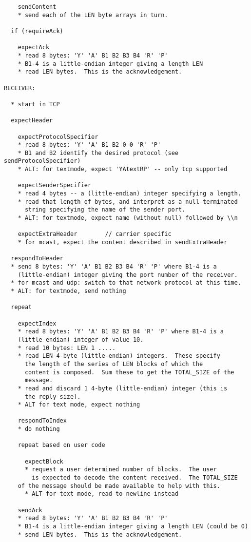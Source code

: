 \documentclass[a4]{article}
\begin{document}
\begin{verbatim}
    sendContent
    * send each of the LEN byte arrays in turn.

  if (requireAck)

    expectAck
    * read 8 bytes: 'Y' 'A' B1 B2 B3 B4 'R' 'P'
    * B1-4 is a little-endian integer giving a length LEN
    * read LEN bytes.  This is the acknowledgement.

RECEIVER:

  * start in TCP

  expectHeader

    expectProtocolSpecifier
    * read 8 bytes: 'Y' 'A' B1 B2 0 0 'R' 'P'
    * B1 and B2 identify the desired protocol (see sendProtocolSpecifier)
    * ALT: for textmode, expect 'YAtextRP' -- only tcp supported

    expectSenderSpecifier
    * read 4 bytes -- a (little-endian) integer specifying a length.
    * read that length of bytes, and interpret as a null-terminated
      string specifying the name of the sender port.
    * ALT: for textmode, expect name (without null) followed by \\n

    expectExtraHeader        // carrier specific
    * for mcast, expect the content described in sendExtraHeader

  respondToHeader
  * send 8 bytes: 'Y' 'A' B1 B2 B3 B4 'R' 'P' where B1-4 is a 
    (little-endian) integer giving the port number of the receiver.
  * for mcast and udp: switch to that network protocol at this time.
  * ALT: for textmode, send nothing

  repeat

    expectIndex
    * read 8 bytes: 'Y' 'A' B1 B2 B3 B4 'R' 'P' where B1-4 is a 
    (little-endian) integer of value 10.
    * read 10 bytes: LEN 1 .....
    * read LEN 4-byte (little-endian) integers.  These specify
      the length of the series of LEN blocks of which the
      content is composed.  Sum these to get the TOTAL_SIZE of the 
      message.
    * read and discard 1 4-byte (little-endian) integer (this is
      the reply size).
    * ALT for text mode, expect nothing

    respondToIndex
    * do nothing

    repeat based on user code
    
      expectBlock
      * request a user determined number of blocks.  The user
        is expected to decode the content received.  The TOTAL_SIZE
	of the message should be made available to help with this.
      * ALT for text mode, read to newline instead

    sendAck
    * read 8 bytes: 'Y' 'A' B1 B2 B3 B4 'R' 'P'
    * B1-4 is a little-endian integer giving a length LEN (could be 0)
    * send LEN bytes.  This is the acknowledgement.


\end{verbatim}
\end{document}
